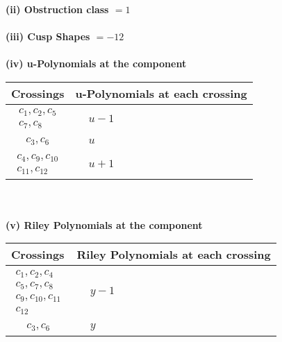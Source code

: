 \documentclass[1p]{elsarticle_modified}
\theoremstyle{definition}
\begin{document}
\flushleft \textbf{(ii) Obstruction class $= 1$}\\~\\
\flushleft \textbf{(iii) Cusp Shapes $= -12$}\\~\\
\newpage\renewcommand{\arraystretch}{1}
\flushleft \textbf{(iv) u-Polynomials at the component}\newline \\
\begin{tabular}{m{50pt}|m{274pt}}
Crossings & \hspace{64pt}u-Polynomials at each crossing \\
\hline $$\begin{aligned}c_{1},c_{2},c_{5}\\c_{7},c_{8}\end{aligned}$$&$\begin{aligned}
&u-1
\end{aligned}$\\
\hline $$\begin{aligned}c_{3},c_{6}\end{aligned}$$&$\begin{aligned}
&u
\end{aligned}$\\
\hline $$\begin{aligned}c_{4},c_{9},c_{10}\\c_{11},c_{12}\end{aligned}$$&$\begin{aligned}
&u+1
\end{aligned}$\\
\hline
\end{tabular}\\~\\
\newpage\renewcommand{\arraystretch}{1}
\flushleft \textbf{(v) Riley Polynomials at the component}\newline \\
\begin{tabular}{m{50pt}|m{274pt}}
Crossings & \hspace{64pt}Riley Polynomials at each crossing \\
\hline $$\begin{aligned}c_{1},c_{2},c_{4}\\c_{5},c_{7},c_{8}\\c_{9},c_{10},c_{11}\\c_{12}\end{aligned}$$&$\begin{aligned}
&y-1
\end{aligned}$\\
\hline $$\begin{aligned}c_{3},c_{6}\end{aligned}$$&$\begin{aligned}
&y
\end{aligned}$\\
\hline
\end{tabular}\\~\\
\end{document}
